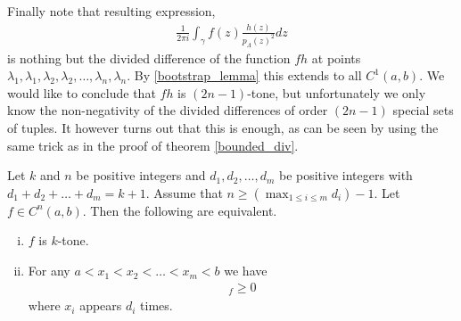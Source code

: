 Finally note that resulting expression,
\begin{align*}
\frac{1}{2 \pi i}\int_{\gamma}f(z) \frac{h(z)}{p_{\Lambda}(z)^2}dz
\end{align*}
is nothing but the divided difference of the function $f h$ at points $\lambda_{1}, \lambda_{1}, \lambda_{2}, \lambda_{2}, \ldots, \lambda_{n}, \lambda_{n}$. By \ref{bootstrap_lemma} this extends to all $C^{1}(a, b)$. We would like to conclude that $f h$ is $(2 n - 1)$-tone, but unfortunately we only know the non-negativity of the divided differences of order $(2 n - 1)$ special sets of tuples. It however turns out that this is enough, as can be seen by using the same trick as in the proof of theorem \ref{bounded_div}.

\begin{lem}
	Let $k$ and $n$ be positive integers and $d_{1}, d_{2}, \ldots, d_{m}$ be positive integers with $d_{1} + d_{2} + \ldots + d_{m} = k + 1$. Assume that $n \geq \left(\max_{1 \leq i \leq m} d_{i} \right) - 1$. Let $f \in C^{n}(a, b)$. Then the following are equivalent.
	\begin{enumerate}[(i)]
		\item $f$ is $k$-tone.
		\item For any $a < x_{1} < x_{2} < \ldots < x_{m} < b$ we have
		\begin{align*}
			[x_{1}, x_{1}, \ldots, x_{1}, x_{2}, \ldots, x_{2}, \ldots, x_{m}, \ldots, x_{m}]_{f} \geq 0
		\end{align*}
		where $x_{i}$ appears $d_{i}$ times.
	\end{enumerate}
\end{lem}

